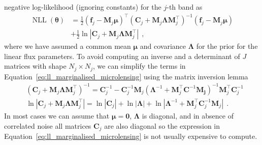 \documentclass[12pt,dvipsnames]{report}
\renewcommand{\vec}[1]{\boldsymbol{\mathbf{#1}}}
\newcommand{\hquad}{~~}
\begin{document}
negative log-likelihood (ignoring constants) for the $j$-th band as
\begin{align}
    \operatorname{NLL}(\vec{\theta}) & =\frac{1}{2}\left( \vec{f}_j-\vec{M}_j\vec{\mu}\right)^\intercal\left(\vec{C}_j + \vec{M}_j\vec{\Lambda}\vec{M}_j^\intercal\right)^{-1}
    \left( \vec{f}_j-\vec{M}_j\vec{\mu}\right)                                                                                                                                 \\
                                     & + \frac{1}{2}\ln\left| \vec{C}_j + \vec{M}_j\vec{\Lambda}\vec{M}_j^\intercal\right|
                                     \hquad,
    \label{eq:ll_marginalised_microlensing}
\end{align}
where we have assumed a common mean $\vec{\mu}$ and covariance $\vec{\Lambda}$ for the
prior for the linear flux parameters.
To avoid computing an inverse and a determinant of $J$ matrices with shape $N_j\times N_j$,
we can simplify the terms in Equation~\ref{eq:ll_marginalised_microlensing} using the
matrix inversion lemma \citep[see for example Appendix A3 in][]{rasmussen2006}
\begin{align}
     & \left(\mathbf{C}_j+\vec{M}_j \boldsymbol{\Lambda} \vec{M}_j^{\intercal}\right)^{-1}=\mathbf{C}_j^{-1}-\mathbf{C}_j^{-1} \vec{M}_j\left(\boldsymbol{\Lambda}^{-1}+\vec{M}_j^{\intercal} \mathbf{C}^{-1} \vec{M_j}\right)^{-1} \vec{M}_j^{\intercal} \mathbf{C}_j^{-1} \\
     & \ln\left|\mathbf{C}_j+\vec{M}_j \vec{\Lambda} \vec{M}_j^{\intercal}\right|=\ln|\mathbf{C}_j| +\ln|\vec{\Lambda}| + \ln\left|\boldsymbol{\Lambda}^{-1}+\vec{M}_j^{\intercal} \mathbf{C}_j^{-1} \vec{M}_j\right|
     \hquad.
\end{align}
In most cases we can assume that $\vec{\mu}=\vec{0}$, $\vec{\Lambda}$ is diagonal, and
in absence of correlated noise all matrices $\vec{C}_j$ are also diagonal so the expression
in Equation~\ref{eq:ll_marginalised_microlensing} is not usually expensive to compute.
\end{document}
